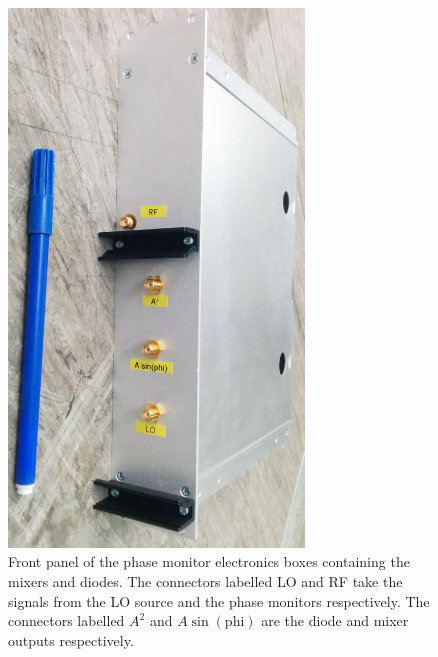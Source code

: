 \begin{figure}
  \centering
  \includegraphics[width=0.7\textwidth]{Figures/phaseMons/mixerFrontPanel}
  \caption{Front panel of the phase monitor electronics boxes containing the mixers and diodes. The connectors labelled LO and RF take the signals from the LO source and the phase monitors respectively. The connectors labelled \(A^2\) and \(A\sin(\mathrm{phi})\) are the diode and mixer outputs respectively.}
  \label{f:mixerFrontPanel}
\end{figure}

